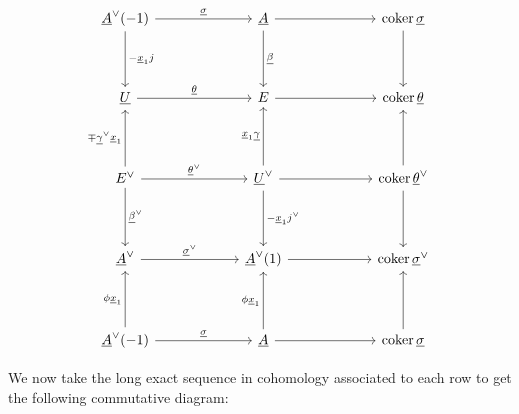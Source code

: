 \documentclass{amsart}
\theoremstyle{definition}
\newcommand{\coker}{\operatorname{coker}}
\newcommand{\UL}[1]{\underline{#1}}
\begin{document}
\begin{equation*}
\begin{tikzcd}[column sep=6em,row sep=4em]
  \UL{A}^{\vee }(-1)
    \arrow[d,"-\UL{x}_{1}j"]
    \arrow[r,"\UL{\sigma  }"]
  & \UL{A}
    \arrow[d,"\UL{\beta }"]
    \arrow[r]
  & \coker \UL{\sigma }
    \arrow[d]
  \\
  \UL{U}
    \arrow[r,"\UL{\theta }"]
  & E
    \arrow[r]
  & \coker \UL{\theta }
  \\
  E^{\vee}
    \arrow[d,"\UL{\beta}^{\vee}"]
    \arrow[u,"\mp \UL{\gamma}^{\vee}\UL{x}_{1}"]
    \arrow[r,"\UL{\theta }^{\vee}"]
  & \UL{U}^{\vee }
    \arrow[r]
    \arrow[d,"-\UL{x}_{1}j^{\vee}"]
    \arrow[u,"\UL{x}_{1}\UL{\gamma }"]
  & \coker \UL{\theta}^{\vee}
    \arrow[d]
    \arrow[u]
  \\
    \UL{A}^{\vee} 
    \arrow[r,"\UL{\sigma  }^{\vee}"]
  & \UL{A}^{\vee}(1)
    \arrow[r]
  & \coker \UL{\sigma}^{\vee}
  \\
  \UL{A}^{\vee }(-1)
    \arrow[u,"\phi \UL{x}_{1}"]
    \arrow[r,"\UL{\sigma  }"]
  & \UL{A}
    \arrow[u,"\phi \UL{x}_{1}"]
    \arrow[r]
  & \coker \UL{\sigma }
    \arrow[u]    
\end{tikzcd}
\end{equation*}

We now take the long exact sequence in cohomology associated to each
row to get the following commutative diagram:
\end{document}
